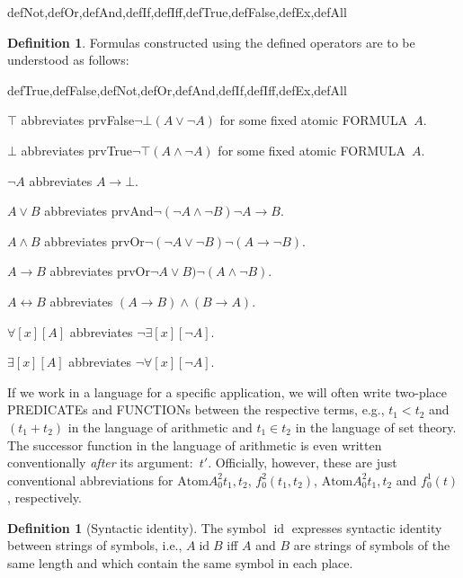 \documentclass[10pt,a4paper]{article}
\newcommand*{\olup}[1]{\MakeUppercase{#1}}
\theoremstyle{plain}
\theoremstyle{definition}
\newtheorem{defn}[thm]{Definition}
\theoremstyle{remark}
\providecommand{\lif}{\mathbin{\rightarrow}}
\providecommand{\lforall}{\mathord{\forall}}
\providecommand{\lexists}{\mathord{\exists}}
\providecommand{\ltrue}{\top}
\providecommand{\lfalse}{\bot}
\providecommand{\Obj}{}
\providecommand{\iftag}[1]{#1}
\providecommand{\tagitem}[1]{\item[#1]}
\providecommand{\liff}{\mathbin{\leftrightarrow}}
\providecommand{\Atom}{\mathrm{Atom}}
\providecommand{\ident}{\operatorname{id}}
\providecommand{\iftag}{}
\begin{document}
\begin{tagblock}{defNot,defOr,defAnd,defIf,defIff,defTrue,defFalse,defEx,defAll}
\begin{defn}
Formulas constructed using the defined operators are to be understood
as follows:

\begin{tagenumerate}{defTrue,defFalse,defNot,defOr,defAnd,defIf,defIff,defEx,defAll}

\tagitem{defTrue}{$\ltrue$ abbreviates
  \iftag{prvFalse}{$\lnot\lfalse$}{$(A \lor \lnot A)$ for some
    fixed atomic \olup{formula}~$A$}.}{}

\tagitem{defFalse}{$\lfalse$ abbreviates
  \iftag{prvTrue}{$\lnot\ltrue$}{$(A \land \lnot A)$ for some
    fixed atomic \olup{formula}~$A$}.}{}

\tagitem{defNot}{$\lnot A$ abbreviates $A \lif \lfalse$.}{}

\tagitem{defOr}{$A \lor B$ abbreviates
  \iftag{prvAnd}{$\lnot(\lnot A \land \lnot B)$}{$\lnot A \lif
    B$}.}{}

\tagitem{defAnd}{$A \land B$ abbreviates
  \iftag{prvOr}{$\lnot(\lnot A \lor \lnot B)$}{$\lnot (A \lif
    \lnot B)$}.}{}

\tagitem{defIf}{$A \lif B$ abbreviates
  \iftag{prvOr}{$\lnot A \lor B)$}{$\lnot (A \land \lnot B)$}.}{}

\tagitem{defIff}{$A \liff B$ abbreviates $(A \lif B) \land (B
  \lif A)$.}{}

\tagitem{defAll}{$\lforall[x][A]$ abbreviates $\lnot\lexists[x][\lnot A]$.}{}

\tagitem{defEx}{$\lexists[x][A]$ abbreviates $\lnot\lforall[x][\lnot A]$.}{}
\end{tagenumerate}
\end{defn}
\end{tagblock}

If we work in a language for a specific application, we will often
write two-place \olup{predicate}s and \olup{function}s between the
respective terms, e.g., $t_1 < t_2$ and $(t_1 + t_2)$ in the language
of arithmetic and $t_1 \in t_2$ in the language of set theory.  The
successor function in the language of arithmetic is even written
conventionally \emph{after} its argument:~$t'$.  Officially, however,
these are just conventional abbreviations for $\Atom{\Obj A^2_0}{t_1, t_2}$,
$\Obj f^2_0(t_1, t_2)$, $\Atom{\Obj A^2_0}{t_1, t_2}$ and $f^1_0(t)$,
respectively.

\begin{defn}[Syntactic identity]
The symbol $\ident$ expresses syntactic identity between strings of
symbols, i.e., $A \ident B$ iff $A$ and $B$ are strings of symbols
of the same length and which contain the same symbol in each place.
\end{defn}
\end{document}
